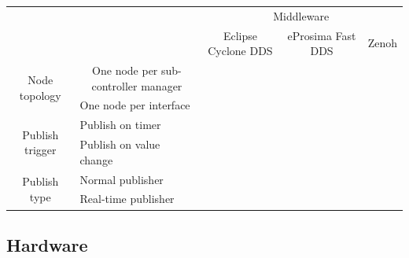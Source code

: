 \begin{table}[]
\begin{tabular}{cl|lll}
\multicolumn{1}{l}{}                                  &                                                          & \multicolumn{3}{c}{Middleware}                                                                                \\ \cline{3-5} 
\multicolumn{1}{l}{}                                  &                                                          & \multicolumn{1}{c|}{Eclipse Cyclone DDS} & \multicolumn{1}{c|}{eProsima Fast DDS} & \multicolumn{1}{c}{Zenoh} \\ \hline
\multicolumn{1}{c|}{\multirow{2}{*}{Node topology}}   & \multicolumn{1}{c|}{One node per sub-controller manager} & \multicolumn{1}{l|}{}                    & \multicolumn{1}{l|}{}                  & \multicolumn{1}{l|}{}     \\ \cline{2-5} 
\multicolumn{1}{c|}{}                                 & One node per interface                                   & \multicolumn{1}{l|}{}                    & \multicolumn{1}{l|}{}                  & \multicolumn{1}{l|}{}     \\ \hline
\multicolumn{1}{c|}{\multirow{2}{*}{Publish trigger}} & Publish on timer                                         & \multicolumn{1}{l|}{}                    & \multicolumn{1}{l|}{}                  & \multicolumn{1}{l|}{}     \\ \cline{2-5} 
\multicolumn{1}{c|}{}                                 & Publish on value change                                  & \multicolumn{1}{l|}{}                    & \multicolumn{1}{l|}{}                  & \multicolumn{1}{l|}{}     \\ \hline
\multicolumn{1}{c|}{\multirow{2}{*}{Publish type}} & Normal publisher                                         & \multicolumn{1}{l|}{}                    & \multicolumn{1}{l|}{}                  & \multicolumn{1}{l|}{}     \\ \cline{2-5} 
\multicolumn{1}{c|}{}                                 & Real-time publisher                                      & \multicolumn{1}{l|}{}                    & \multicolumn{1}{l|}{}                  & \multicolumn{1}{l|}{}     \\ \hline
\end{tabular}
\end{table}

\subsection{Hardware}
